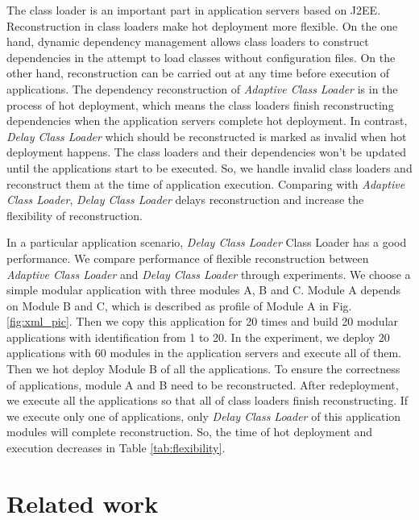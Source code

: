 \documentclass[conference]{IEEEtran}
\begin{document}
The class loader is an important part in application servers based on J2EE.
Reconstruction in class loaders make hot deployment more flexible.
On the one hand, dynamic dependency management allows class loaders to construct dependencies in the attempt to load classes without configuration files.
On the other hand, reconstruction can be carried out at any time before execution of applications.
The dependency reconstruction of \emph{Adaptive Class Loader} is in the process of hot deployment, which means the class loaders finish reconstructing dependencies when the application servers complete hot deployment.
In contrast, \emph{Delay Class Loader} which should be reconstructed is marked as invalid when hot deployment happens.
The class loaders and their dependencies won't be updated until the applications start to be executed.
So, we handle invalid class loaders and reconstruct them at the time of application execution.
Comparing with \emph{Adaptive Class Loader}, \emph{Delay Class Loader} delays reconstruction and increase the flexibility of reconstruction.

In a particular application scenario, \emph{Delay Class Loader} Class Loader has a good performance. 
We compare performance of flexible reconstruction between \emph{Adaptive Class Loader} and \emph{Delay Class Loader} through experiments.
We choose a simple modular application with three modules A, B and C.
Module A depends on Module B and C, which is described as profile of Module A in Fig.\ref{fig:xml_pic}.
Then we copy this application for 20 times and build 20 modular applications with identification from 1 to 20.
In the experiment, we deploy 20 applications with 60 modules in the application servers and execute all of them.
Then we hot deploy Module B of all the applications.
To ensure the correctness of applications, module A and B need to be reconstructed.
After redeployment, we execute all the applications so that all of class loaders finish reconstructing.
If we execute only one of applications, only \emph{Delay Class Loader} of this application modules will complete reconstruction.
So, the time of hot deployment and execution decreases in Table \ref{tab:flexibility}. 



\section{Related work\label{sec:relatedwork}}
\end{document}
